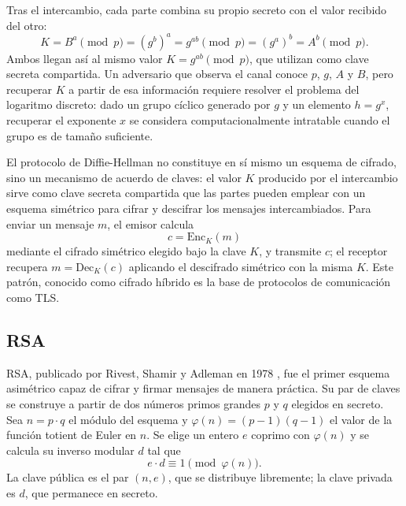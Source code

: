 Tras el intercambio, cada parte combina su propio secreto con el valor recibido del otro:
\begin{equation}
    K = B^a \pmod{p} = (g^b)^a = g^{ab} \pmod{p} = (g^a)^b = A^b \pmod{p}.
\end{equation}
Ambos llegan así al mismo valor $K = g^{ab} \pmod{p}$, que utilizan como clave secreta compartida. Un adversario que observa el canal conoce $p$, $g$, $A$ y $B$, pero recuperar $K$ a partir de esa información requiere resolver el problema del logaritmo discreto: dado un grupo cíclico generado por $g$ y un elemento $h = g^x$, recuperar el exponente $x$ se considera computacionalmente intratable cuando el grupo es de tamaño suficiente.

El protocolo de Diffie-Hellman no constituye en sí mismo un esquema de cifrado, sino un mecanismo de acuerdo de claves: el valor $K$ producido por el intercambio sirve como clave secreta compartida que las partes pueden emplear con un esquema simétrico para cifrar y descifrar los mensajes intercambiados. Para enviar un mensaje $m$, el emisor calcula
\begin{equation}
    c = \text{Enc}_K(m)
\end{equation}
mediante el cifrado simétrico elegido bajo la clave $K$, y transmite $c$; el receptor recupera $m = \text{Dec}_K(c)$ aplicando el descifrado simétrico con la misma $K$. Este patrón, conocido como cifrado híbrido es la base de protocolos de comunicación como TLS.

\subsection{RSA}

RSA, publicado por Rivest, Shamir y Adleman en 1978 \cite{RSA78}, fue el primer esquema asimétrico capaz de cifrar y firmar mensajes de manera práctica. Su par de claves se construye a partir de dos números primos grandes $p$ y $q$ elegidos en secreto. Sea $n = p \cdot q$ el módulo del esquema y $\varphi(n) = (p-1)(q-1)$ el valor de la función totient de Euler en $n$. Se elige un entero $e$ coprimo con $\varphi(n)$ y se calcula su inverso modular $d$ tal que
\begin{equation}
    e \cdot d \equiv 1 \pmod{\varphi(n)}.
\end{equation}
La clave pública es el par $(n, e)$, que se distribuye libremente; la clave privada es $d$, que permanece en secreto.

